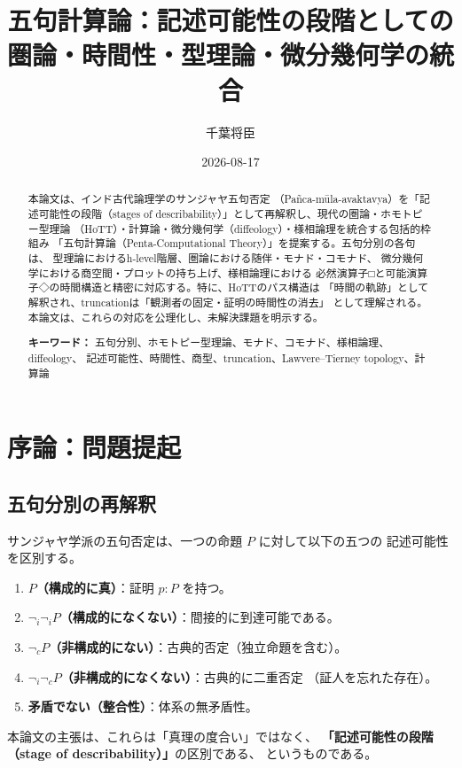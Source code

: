 \documentclass[11pt,a4paper]{ltjsarticle}
\title{五句計算論：記述可能性の段階としての\\
圏論・時間性・型理論・微分幾何学の統合}
\author{千葉将臣}
\date{2026-08-17}
\theoremstyle{remark}
\begin{document}
\maketitle

\begin{abstract}
本論文は、インド古代論理学のサンジャヤ五句否定
（Pañca-mūla-avaktavya）を「記述可能性の段階（stages of
describability）」として再解釈し、現代の圏論・ホモトピー型理論
（HoTT）・計算論・微分幾何学（diffeology）・様相論理を統合する包括的枠組み
「五句計算論（Penta-Computational Theory）」を提案する。五句分別の各句は、
型理論におけるh-level階層、圏論における随伴・モナド・コモナド、
微分幾何学における商空間・プロットの持ち上げ、様相論理における
必然演算子□と可能演算子◇の時間構造と精密に対応する。特に、HoTTのパス構造は
「時間の軌跡」として解釈され、truncationは「観測者の固定・証明の時間性の消去」
として理解される。本論文は、これらの対応を公理化し、未解決課題を明示する。

\medskip
\noindent\textbf{キーワード：}
五句分別、ホモトピー型理論、モナド、コモナド、様相論理、diffeology、
記述可能性、時間性、商型、truncation、Lawvere--Tierney topology、計算論
\end{abstract}

\section{序論：問題提起}

\subsection{五句分別の再解釈}

サンジャヤ学派の五句否定は、一つの命題 $P$ に対して以下の五つの
記述可能性を区別する。

\begin{enumerate}
  \item \textbf{$P$（構成的に真）}：証明 $p:P$ を持つ。
  \item \textbf{$\neg_i\neg_i P$（構成的になくない）}：間接的に到達可能である。
  \item \textbf{$\neg_c P$（非構成的にない）}：古典的否定（独立命題を含む）。
  \item \textbf{$\neg_i\neg_c P$（非構成的になくない）}：古典的に二重否定
  （証人を忘れた存在）。
  \item \textbf{矛盾でない（整合性）}：体系の無矛盾性。
\end{enumerate}

本論文の主張は、これらは「真理の度合い」ではなく、
\textbf{「記述可能性の段階（stage of describability）」}の区別である、
というものである。
\end{document}
